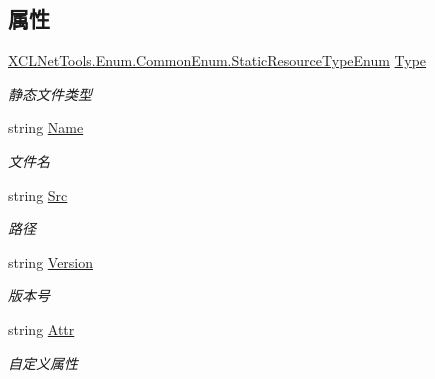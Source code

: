 \subsection*{属性}
\begin{DoxyCompactItemize}
\item 
\hyperlink{class_x_c_l_net_tools_1_1_enum_1_1_common_enum_abe6c6928080288df4a77ec8a59c537d1}{X\+C\+L\+Net\+Tools.\+Enum.\+Common\+Enum.\+Static\+Resource\+Type\+Enum} \hyperlink{class_x_c_l_net_tools_1_1_entity_1_1_static_resource_a182146de67a26e9ab0efdd2e8e3460dc}{Type}
\begin{DoxyCompactList}\small\item\em 静态文件类型 \end{DoxyCompactList}\item 
string \hyperlink{class_x_c_l_net_tools_1_1_entity_1_1_static_resource_a8e114996e0fb52d9543e5b018e0d09e5}{Name}
\begin{DoxyCompactList}\small\item\em 文件名 \end{DoxyCompactList}\item 
string \hyperlink{class_x_c_l_net_tools_1_1_entity_1_1_static_resource_a956fb610dd51730bbe8aac6a04d72da3}{Src}
\begin{DoxyCompactList}\small\item\em 路径 \end{DoxyCompactList}\item 
string \hyperlink{class_x_c_l_net_tools_1_1_entity_1_1_static_resource_a4b85a7d2f6dc6169a10ebfe2987f2404}{Version}
\begin{DoxyCompactList}\small\item\em 版本号 \end{DoxyCompactList}\item 
string \hyperlink{class_x_c_l_net_tools_1_1_entity_1_1_static_resource_a7541eec0c18e1aac9a8d0c980f1c7b35}{Attr}
\begin{DoxyCompactList}\small\item\em 自定义属性 \end{DoxyCompactList}\end{DoxyCompactItemize}


